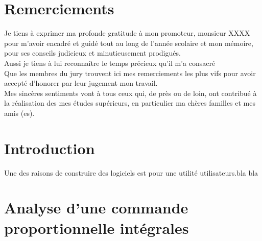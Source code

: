 \documentclass[12pt, a4paper, openany]{report}
\begin{document}
\makeatother



\chapter*{Remerciements}

  Je tiens à exprimer ma profonde gratitude à mon promoteur, monsieur XXXX pour m'avoir encadré et guidé tout au long de l'année scolaire et mon mémoire, pour ses conseils judicieux et minutieusement prodigués.\\
  
  Aussi je tiens à lui reconnaître le temps précieux qu’il m'a consacré \\
  
   Que les membres du jury trouvent ici mes remerciements les plus vifs pour avoir accepté d’honorer par leur jugement mon travail.\\
   
   Mes sincères sentiments vont à tous ceux qui, de près ou de loin, ont contribué à la réalisation des mes études supérieurs, en particulier ma chères familles et mes amis (es).\\
   
   
\renewcommand{\contentsname}{Sommaire}
\tableofcontents



\chapter*{Introduction}
 
  Une des raisons de construire des logiciels est pour une utilité utilisateurs.bla bla
                                                      



\chapter{ Analyse d'une commande proportionnelle intégrales}
\end{document}
